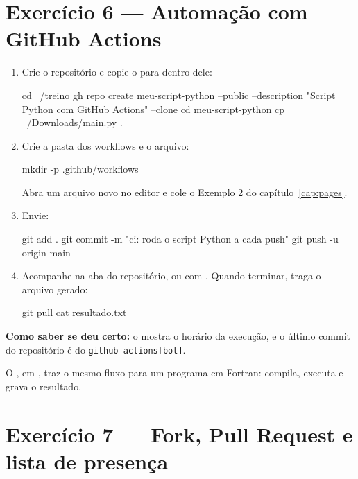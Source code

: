 \section{Exercício 6 — Automação com GitHub Actions}

\begin{enumerate}
  \item Crie o repositório e copie o  para dentro dele:
\begin{bashcode}
cd ~/treino
gh repo create meu-script-python --public --description "Script Python com GitHub Actions" --clone
cd meu-script-python
cp ~/Downloads/main.py .
\end{bashcode}

  \item Crie a pasta dos workflows e o arquivo:
\begin{bashcode}
mkdir -p .github/workflows
\end{bashcode}
  Abra um arquivo novo  no editor e cole o
  Exemplo 2 do capítulo~\ref{cap:pages}.

  \item Envie:
\begin{bashcode}
git add .
git commit -m "ci: roda o script Python a cada push"
git push -u origin main
\end{bashcode}

  \item Acompanhe na aba  do repositório, ou com
        . Quando terminar, traga o arquivo gerado:
\begin{bashcode}
git pull
cat resultado.txt
\end{bashcode}
\end{enumerate}

\textbf{Como saber se deu certo:} o  mostra o horário da
execução, e o último commit do repositório é do \texttt{github-actions[bot]}.

\begin{dica}
O , em , traz o mesmo fluxo para um
programa em Fortran: compila, executa e grava o resultado.
\end{dica}

\section{Exercício 7 — Fork, Pull Request e lista de presença}
\label{sec:ex_presenca}

